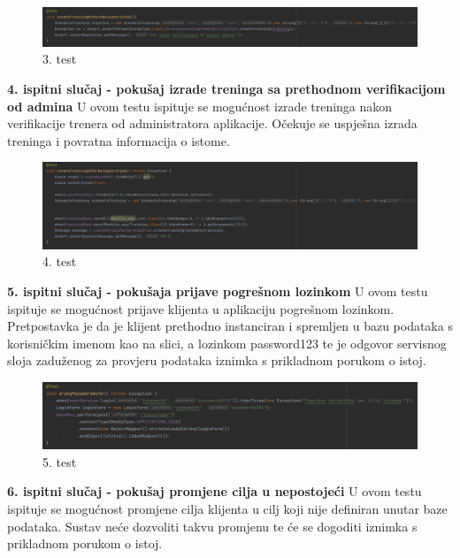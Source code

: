             \begin{figure}[H]
		\includegraphics[scale=0.375]{./Slike/test3.png}
		\centering
		\caption{3. test }
		\label{fig:promjene}
	    \end{figure}
            \noindent \textbf{ 4. ispitni slučaj - pokušaj izrade treninga sa prethodnom verifikacijom od admina}
            \newline U ovom testu ispituje se mogućnost izrade treninga nakon verifikacije trenera od administratora aplikacije. Očekuje se uspješna izrada treninga i povratna informacija o istome.
            
            \begin{figure}[H]
		\includegraphics[scale=0.375]{./Slike/test4.png}
		\centering
		\caption{4. test }
		\label{fig:promjene}
	    \end{figure}
            \noindent \textbf{ 5. ispitni slučaj - pokušaja prijave pogrešnom lozinkom}
            \newline U ovom testu ispituje se mogućnost prijave klijenta u aplikaciju pogrešnom lozinkom. Pretpostavka je da je klijent prethodno instanciran i spremljen u bazu podataka s korisničkim imenom kao na slici, a lozinkom password123 te je odgovor servisnog sloja zaduženog za provjeru podataka iznimka s prikladnom porukom o istoj.
     
            \begin{figure}[H]
		\includegraphics[scale=0.45]{./Slike/test5.png}
		\centering
		\caption{5. test }
		\label{fig:promjene}
	    \end{figure}

            \noindent \textbf{ 6. ispitni slučaj - pokušaj promjene cilja u nepostojeći}
            U ovom testu ispituje se mogućnost promjene cilja klijenta u cilj koji nije definiran unutar baze podataka. Sustav neće dozvoliti takvu promjenu te će se dogoditi iznimka s prikladnom porukom o istoj.
     
